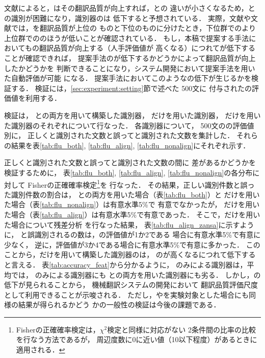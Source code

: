 \documentclass[japanese]{jnlp_1.4}
\newcommand{\AL}{}
\newcommand{\NAL}{}
\newcommand{\FLU}{}
\newcommand{\HUM}{}
\newcommand{\MT}{}
\newcommand{\ACC}{}
\newcommand{\MTS}{}
\newcommand{\MTF}{}
\newcommand{\MTL}{}
\begin{document}
文献\cite{Oliver01}によると，{\MT}はその翻訳品質が向上すれば，{\HUM}との
違いが小さくなるため，{\HUM}との識別が困難になり，識別器の{\ACC}は
低下すると予想されている．
実際，文献\cite{Sun07}や文献\cite{Tanaka08}では，{\MT}を翻訳品質が上位の
ものと下位のものに分けたとき，下位群での{\ACC}より
上位群での{\ACC}のほうが低いことが確認されている．
もし，本稿で提案する手法においても{\MT}の翻訳品質が向上する（人手評価値が
高くなる）につれて{\ACC}が低下することが確認できれば，
提案手法の{\ACC}が低下するかどうかによって翻訳品質が向上したかどうかを
判断できることになり，システム開発において提案手法を用いた自動評価が可能
になる．
提案手法においてこのような{\ACC}の低下が生じるかを検証する．
検証には，\ref{sec:experiment:setting}節で述べた{\MTS} 500文に
付与された{\FLU}の評価値を利用する．


検証は，
{\AL}と{\NAL}の両方を用いて構築した識別器，
{\AL}だけを用いた識別器，
{\NAL}だけを用いた識別器のそれぞれについて行なった．
各識別器について，{\MTS} 500文の{\FLU}の評価値別に，
正しく{\MT}と識別された文数と誤って{\HUM}と識別された文数を集計した．
それらの結果を表\ref{tab:flu_both}, \ref{tab:flu_align}, 
\ref{tab:flu_nonalign}にそれぞれ示す．


\begin{table}[b]
\caption{{\AL}と{\NAL}による識別器の{\ACC}と{\FLU}}
\label{tab:flu_both}

\end{table}
\begin{table}[b]
\caption{{\AL}のみによる識別器の{\ACC}と{\FLU}}
\label{tab:flu_align}

\end{table}
\begin{table}[b]
\caption{{\NAL}のみによる識別器の{\ACC}と{\FLU}}
\label{tab:flu_nonalign}

\end{table}

正しく{\MT}と識別された文数と誤って{\HUM}と識別された文数の間に
差があるかどうかを検証するために，
表\ref{tab:flu_both}, \ref{tab:flu_align}, 
\ref{tab:flu_nonalign}の各分布に対して
Fisherの正確確率検定\footnote{Fisherの正確確率検定は，$\chi^2$検定と同様に対応がない
2条件間の比率の比較を行なう方法であるが，
周辺度数に0に近い値（10以下程度）があるときに適用される\cite{Mori06}．}を
行なった．
その結果，正しい識別件数と誤った識別件数の割合は，
{\AL}と{\NAL}の両方を用いた場合（表\ref{tab:flu_both}）と
{\NAL}だけを用いた場合（表\ref{tab:flu_nonalign}）は有意水準5\%で
有意でなかったが，
{\AL}だけを用いた場合（表\ref{tab:flu_align}）は有意水準5\%で有意であった．
そこで，{\AL}だけを用いた場合について残差分析
\cite{Tanaka05}
を行なった結果，
表\ref{tab:flu_align_zansa}に示すように，
{\HUM}と誤識別される{\MT}の数は，{\FLU}の評価値が1か2である
場合に有意水準5\%で有意に少なく，
逆に，評価値が3か4である場合に有意水準5\%で有意に多かった．
このことから，{\AL}だけを用いて構築した識別器の{\ACC}は，
{\MT}の{\FLU}が高くなるにつれて低下すると言える．
表\ref{tab:accuracy_feat}から分かるように，
{\AL}のみによる識別器は，平均{\ACC}では，
{\NAL}のみによる識別器にも
{\AL}と{\NAL}の両方を用いた識別器にも劣る．
しかし，{\ACC}の低下が見られることから，
機械翻訳システムの開発において
翻訳品質評価尺度として利用できることが示唆される．
ただし，{\MTF}や{\MTL}を実験対象とした場合にも同様の結果が得られるかどう
かの一般性の検証は今後の課題である．
\end{document}
